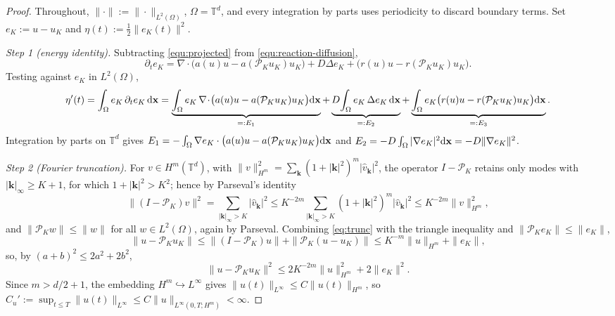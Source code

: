 \documentclass[a4paper,fleqn]{cas-sc}
\theoremstyle{definition}
\theoremstyle{remark}
\begin{document}
\begin{proof}
Throughout, $\|\cdot\|:=\|\cdot\|_{L^2(\Omega)}$, $\Omega=\mathbb T^d$, and every
integration by parts uses periodicity to discard boundary terms. Set $e_K:=u-u_K$
and $\eta(t):=\tfrac12\|e_K(t)\|^2$.

\emph{Step 1 (energy identity).} Subtracting \eqref{equ:projected} from
\eqref{equ:reaction-diffusion},
\[
\partial_t e_K=\nabla\!\cdot\!\bigl(a(u)u-a(\mathcal P_Ku_K)u_K\bigr)+D\Delta e_K
+\bigl(r(u)u-r(\mathcal P_Ku_K)u_K\bigr).
\]
Testing against $e_K$ in $L^2(\Omega)$,
\[
\eta'(t)=\int_\Omega e_K\,\partial_t e_K\,\mathrm{d}\mathbf{x}
=\underbrace{\int_\Omega e_K\,\nabla\!\cdot\!\bigl(a(u)u-a(\mathcal P_Ku_K)u_K\bigr)\mathrm{d}\mathbf{x}}_{=:E_1}
+\underbrace{D\!\int_\Omega e_K\,\Delta e_K\,\mathrm{d}\mathbf{x}}_{=:E_2}
+\underbrace{\int_\Omega e_K\bigl(r(u)u-r(\mathcal P_Ku_K)u_K\bigr)\mathrm{d}\mathbf{x}}_{=:E_3}.
\]
Integration by parts on $\mathbb T^d$ gives
$E_1=-\int_\Omega\nabla e_K\cdot\bigl(a(u)u-a(\mathcal P_Ku_K)u_K\bigr)\mathrm{d}\mathbf{x}$ and
$E_2=-D\int_\Omega|\nabla e_K|^2\mathrm{d}\mathbf{x}=-D\|\nabla e_K\|^2$.

\emph{Step 2 (Fourier truncation).} For $v\in H^m(\mathbb T^d)$, with
$\|v\|_{H^m}^2=\sum_{\mathbf k}(1+|\mathbf k|^2)^m|\hat v_{\mathbf k}|^2$, the operator
$I-\mathcal P_K$ retains only modes with $|\mathbf k|_\infty\ge K+1$, for which
$1+|\mathbf k|^2>K^2$; hence by Parseval's identity
\begin{equation}\label{eq:trunc}
\|(I-\mathcal P_K)v\|^2=\!\!\sum_{|\mathbf k|_\infty>K}\!\!|\hat v_{\mathbf k}|^2
\le K^{-2m}\!\!\sum_{|\mathbf k|_\infty>K}\!\!(1+|\mathbf k|^2)^m|\hat v_{\mathbf k}|^2
\le K^{-2m}\|v\|_{H^m}^2,
\end{equation}
and $\|\mathcal P_Kw\|\le\|w\|$ for all $w\in L^2(\Omega)$, again by Parseval.
Combining \eqref{eq:trunc} with the triangle inequality and $\|\mathcal P_Ke_K\|\le\|e_K\|$,
\begin{equation}\label{eq:upK}
\|u-\mathcal P_Ku_K\|\le\|(I-\mathcal P_K)u\|+\|\mathcal P_K(u-u_K)\|\le K^{-m}\|u\|_{H^m}+\|e_K\|,
\end{equation}
so, by $(a+b)^2\le2a^2+2b^2$,
\begin{equation}\label{eq:upK2}
\|u-\mathcal P_Ku_K\|^2\le 2K^{-2m}\|u\|_{H^m}^2+2\|e_K\|^2.
\end{equation}
Since $m>d/2+1$, the embedding $H^m\hookrightarrow L^\infty$ gives
$\|u(t)\|_{L^\infty}\le C\|u(t)\|_{H^m}$, so
$C_u':=\sup_{t\le T}\|u(t)\|_{L^\infty}\le C\|u\|_{L^\infty(0,T;H^m)}<\infty$.


\end{proof}
\end{document}
